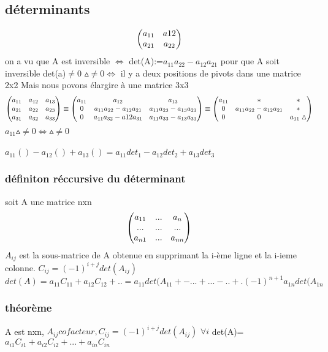 \documentclass[a4paper,10pt]{article}
\begin{document}
\subsection{déterminants}
\[
\begin{pmatrix}
a_{11}&a{12}\cr
a_{21}&a_{22}\cr
\end{pmatrix}
\]
on a vu que A est inversible $\Leftrightarrow$ det(A):=$a_{11}a_{22}-a_{12}a_{21}$
\newline
pour que A soit inversible det(a)$\neq0$
\newline
$\vartriangle\neq 0\Leftrightarrow$ il y a deux positions de pivots dans une matrice 2x2
\newline
Mais nous povons élargire à une matrice 3x3
\[
\begin{pmatrix}
a_{11}&a_{12}&a_{13}\cr
a_{21}&a_{22}&a_{23}\cr
a_{31}&a_{32}&a_{33}\cr
\end{pmatrix}
\equiv
\begin{pmatrix}
a_{11}&a_{12}&a_{13}\cr
0&a_{11}a_{22}-a_{12}a_{21}&a_{11}a_{23}-a_{13}a_{21}\cr
0&a_{11}a_{32}-a{12}a_{31}&a_{11}a_{33}-a_{13}a_{31}\cr
\end{pmatrix}
\equiv
\begin{pmatrix}
a_{11}&*&*\cr
0&a_{11}a_{22}-a_{12}a_{21}&*\cr
0&0&a_{11}\vartriangle\cr
\end{pmatrix}
\]
\newline
$a_{11}\vartriangle\neq0\Leftrightarrow\vartriangle\neq0$
\paragraph{}
$a_{11}()-a_{12}()+a_{13}()=a_{11}det_1-a_{12}det_2+a_{13}det_3$
\subsubsection{définiton réccursive du déterminant}
soit A une matrice nxn
\newline
\[
\begin{pmatrix}
a_{11}&...&a_n\cr
...&...&...\cr
a_{n1}&...&a_{nn}\cr
\end{pmatrix}\]
\newline
$A_{ij}$ est la sous-matrice de A obtenue en supprimant la i-ème ligne et la i-ieme colonne.
\newline
$C_{ij}=(-1)^{i+j}det(A_{ij})$
\newline
$det(A)=a_{11}C_{11}+a_{12}C_{12}+..=a_{11}det(A_{11}+-...+...-..+.(-1)^{n+1}a_{1n}det(A_{1n}$
\subsubsection{théorème}
A est nxn, $A_{ij} cofacteur,C_{ij}=(-1)^{i+j}det(A_{ij})$
\newline
$\forall i$ det(A)=$a_{i1}C_{i1}+a_{i2}C_{i2}+...+a_{in}C_{in}$
\end{document}
